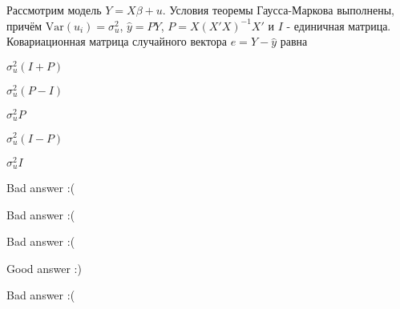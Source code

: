 
\begin{question}
Рассмотрим модель \(Y = X \beta + u\). Условия теоремы Гаусса-Маркова выполнены, причём \(\mathrm{Var}(u_i) = \sigma^2_{u}\), \(\hat y = PY\), \(P = X (X'X)^{-1} X'\) и \(I\) - единичная матрица. Ковариационная матрица случайного вектора \(e=Y-\hat y\) равна
\begin{answerlist}
  \item \(\sigma^2_{u} (I+P)\)
  \item \(\sigma^2_{u} (P-I)\)
  \item \(\sigma^2_{u} P\)
  \item \(\sigma^2_{u} (I - P)\)
  \item \(\sigma^2_{u} I\)
\end{answerlist}
\end{question}

\begin{solution}
\begin{answerlist}
  \item Bad answer :(
  \item Bad answer :(
  \item Bad answer :(
  \item Good answer :)
  \item Bad answer :(
\end{answerlist}
\end{solution}

